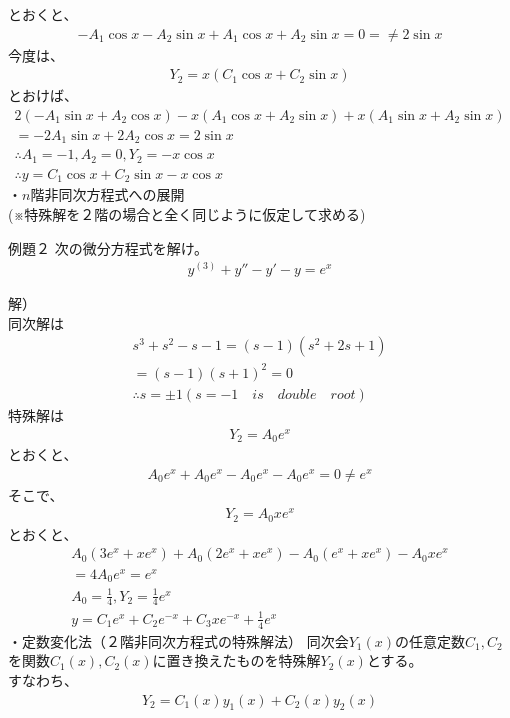 \documentclass{jsarticle}
\begin{document}
とおくと、
\begin{eqnarray}
-A_1\cos x-A_2\sin x+A_1\cos x +A_2 \sin x=0=\neq 2\sin x
\end{eqnarray}
今度は、
\begin{eqnarray}
Y_2=x(C_1\cos x+C_2\sin x)
\end{eqnarray}
とおけば、
\begin{eqnarray}
2(-A_1\sin x+A_2 \cos x)-x(A_1\cos x+A_2 \sin x)+x(A_1\sin x+A_2\sin x)\\
=-2A_1\sin x+2A_2\cos x = 2\sin x\\
\therefore A_1=-1,A_2=0,Y_2=-x\cos x\\
\therefore y=C_1\cos x+C_2\sin x-x\cos x
\end{eqnarray}
・$n$階非同次方程式への展開\\
(※特殊解を２階の場合と全く同じように仮定して求める)
\begin{itembox}[l]{例題２}
次の微分方程式を解け。
\begin{eqnarray}
y^{(3)}+y''-y'-y=e^x
\end{eqnarray}
\end{itembox}
解）\\
同次解は
\begin{eqnarray}
s^3+s^2-s-1=(s-1)(s^2+2s+1)\\
=(s-1)(s+1)^2=0\\
\therefore s=\pm 1 (s=-1 \quad is \quad double \quad root)
\end{eqnarray}
特殊解は
\begin{eqnarray}
Y_2=A_0e^x
\end{eqnarray}
とおくと、
\begin{eqnarray}
A_0e^x+A_0e^x-A_0e^x-A_0e^x=0\neq e^x
\end{eqnarray}
そこで、
\begin{eqnarray}
Y_2=A_0xe^x
\end{eqnarray}
とおくと、
\begin{eqnarray}
A_0(3e^x+xe^x)+A_0(2e^x+xe^x)-A_0(e^x+xe^x)-A_0xe^x\\
=4A_0e^x=e^x\\
A_0=\frac{1}{4},Y_2=\frac{1}{4}e^x\\
y=C_1e^x+C_2e^{-x}+C_3xe^{-x}+\frac{1}{4}e^x
\end{eqnarray}
・定数変化法（２階非同次方程式の特殊解法）
同次会$Y_1(x)$の任意定数$C_1,C_2$を関数$C_1(x),C_2(x)$に置き換えたものを特殊解$Y_2(x)$とする。\\
すなわち、
\begin{eqnarray}
Y_2=C_1(x)y_1(x)+C_2(x)y_2(x)
\end{eqnarray}
\end{document}
